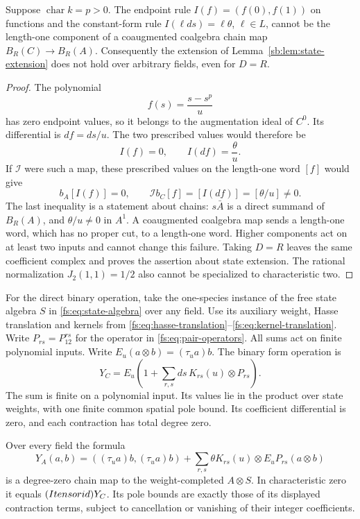 \begin{proposition}
\label{sb:prop:length-one-obstruction}
Suppose \(\operatorname{char}k=p>0\).  The endpoint rule
\(I(f)=(f(0),f(1))\) on functions and the constant-form rule
\(I(\ell ds)=\ell\theta\), \(\ell\in L\), cannot be the
length-one component of a coaugmented coalgebra chain map
\(B_R(C)\to B_R(A)\).  Consequently the extension of
Lemma~\ref{sb:lem:state-extension} does not hold over arbitrary fields,
even for \(D=R\).
\end{proposition}

\begin{proof}
The polynomial
\[
 f(s)=\frac{s-s^p}{u}
\]
has zero endpoint values, so it belongs to the augmentation ideal
of \(C^0\).  Its differential is \(df=ds/u\).
The two prescribed values would therefore be
\[
 I(f)=0,\qquad I(df)=\frac{\theta}{u}.
\]
If \(\mathcal I\) were such a map, these prescribed values on
the length-one word \([f]\) would give
\[
 b_A[I(f)]=0,
 \qquad
 \mathcal I b_C[f]=[I(df)]=[\theta/u]\ne0.
\]
The last inequality is a statement about chains: \(s\bar A\)
is a direct summand of \(B_R(A)\), and \(\theta/u\ne0\)
in \(A^1\).  A coaugmented coalgebra map sends a length-one word,
which has no proper cut, to a length-one word.  Higher components
act on at least two inputs and cannot change this failure.
Taking \(D=R\) leaves the same coefficient complex and proves
the assertion about state extension.  The rational normalization
\(J_2(1,1)=1/2\) also cannot be specialized to characteristic two.
\end{proof}

For the direct binary operation, take the one-species instance of
the free state algebra \(S\) in \eqref{fs:eq:state-algebra} over any
field.  Use its auxiliary weight, Hasse translation and kernels from
\eqref{fs:eq:hasse-translation}--\eqref{fs:eq:kernel-translation}.
Write \(P_{rs}=P_{12}^{rs}\) for the operator in
\eqref{fs:eq:pair-operators}.  All sums act on finite polynomial inputs.
Write \(E_u(a\otimes b)=(\tau_u a)b\).  The binary form operation is
\[
 Y_C=E_u\left(1+\sum_{r,s}ds\,K_{rs}(u)\otimes P_{rs}\right).
\]
The sum is finite on a polynomial input.  Its values lie in the
product over state weights, with one finite common spatial pole bound.
Its coefficient differential is zero, and each contraction has total
degree zero.

\begin{proposition}
\label{sb:prop:binary-transfer}
Over every field the formula
\[
 Y_A(a,b)=((\tau_u a)b,(\tau_u a)b)
    +\sum_{r,s}\theta K_{rs}(u)\otimes E_uP_{rs}(a\otimes b)
\]
is a degree-zero chain map to the weight-completed \(A\otimes S\).
In characteristic zero it equals \((Itensorid)Y_C\).
Its pole bounds are exactly those of its displayed contraction terms,
subject to cancellation or vanishing of their integer coefficients.
\end{proposition}


